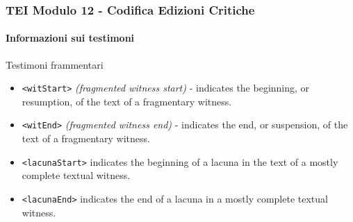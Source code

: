 \begin{frame}
    \frametitle{TEI Modulo 12 - Codifica Edizioni Critiche}
    \framesubtitle{Informazioni sui testimoni}
    \addtocounter{nframe}{1}

    
    \begin{block}{Testimoni frammentari}

       \begin{itemize}
           \item \texttt{<witStart>} \textit{(fragmented witness start)} - indicates the beginning, or resumption, of the text of a fragmentary witness.
           \item \texttt{<witEnd>} \textit{(fragmented witness end)} -  indicates the end, or suspension, of the text of a fragmentary witness.
           \item \texttt{<lacunaStart>} indicates the beginning of a lacuna in the text of a mostly complete textual witness.
           \item \texttt{<lacunaEnd>} indicates the end of a lacuna in a mostly complete textual witness.
       \end{itemize}
      
    \end{block}


\end{frame}



